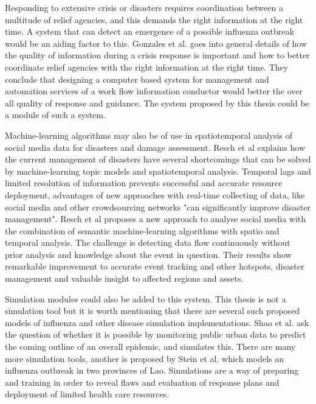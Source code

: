 Responding to extensive crisis or disasters requires coordination between a multitude of relief agencies, and this demands the right information at the right time. A system that can detect an emergence of a possible influenza outbreak would be an aiding factor to this. Gonzales et al. \cite{gonzalez2009framework} goes into general details of how the quality of information during a crisis response is important and how to better coordinate relief agencies with the right information at the right time. They conclude that designing a computer based system for management and automation services of a work flow information conductor would better the over all quality of response and guidance. The system proposed by this thesis could be a module of such a system. 

Machine-learning algorithms may also be of use in spatiotemporal analysis of social media data for disasters and damage assessment. Resch et al \cite{resch2018combining} explains how the current management of disasters have several shortcomings that can be solved by machine-learning topic models and spatiotemporal analysis. Temporal lags and limited resolution of information prevents successful and accurate resource deployment, advantages of new approaches with real-time collecting of data, like social media and other crowdsourcing networks "can significantly improve disaster management". Resch et al proposes a new approach to analyse social media with the combination of semantic machine-learning algorithms with spatio and temporal analysis. The challenge is detecting data flow continuously without prior analysis and knowledge about the event in question. Their results show remarkable improvement to accurate event tracking and other hotspots, disaster management and valuable insight to affected regions and assets.

Simulation modules could also be added to this system. This thesis is not a simulation tool but it is worth mentioning that there are several such proposed models of influenza and other disease simulation implementations. Shao et al. \cite{shao2016forecasting} ask the question of whether it is possible by monitoring public urban data to predict the coming outline of an overall epidemic, and simulates this. There are many more simulation tools, another is proposed by Stein et al. \cite{stein2012development} which models an influenza outbreak in two provinces of Lao. Simulations are a way of preparing and training in order to reveal flaws and evaluation of response plans and deployment of limited health care resources.

